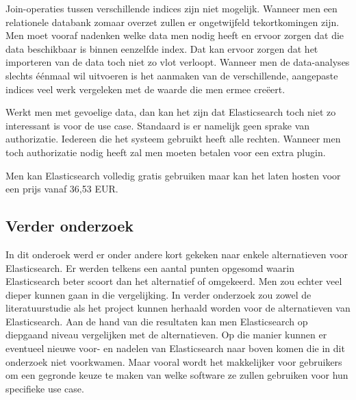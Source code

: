 Join-operaties tussen verschillende indices zijn niet mogelijk. Wanneer men een relationele databank zomaar overzet zullen er ongetwijfeld tekortkomingen zijn. Men moet vooraf nadenken welke data men nodig heeft en ervoor zorgen dat die data beschikbaar is binnen eenzelfde index. Dat kan ervoor zorgen dat het importeren van de data toch niet zo vlot verloopt. Wanneer men de data-analyses slechts éénmaal wil uitvoeren is het aanmaken van de verschillende, aangepaste indices veel werk vergeleken met de waarde die men ermee creëert.

Werkt men met gevoelige data, dan kan het zijn dat Elasticsearch toch niet zo interessant is voor de use case. Standaard is er namelijk geen sprake van authorizatie. Iedereen die het systeem gebruikt heeft alle rechten. Wanneer men toch authorizatie nodig heeft zal men moeten betalen voor een extra plugin.

Men kan Elasticsearch volledig gratis gebruiken maar kan het laten hosten voor een prijs vanaf 36,53 EUR.

\subsection{Verder onderzoek}

In dit onderoek werd er onder andere kort gekeken naar enkele alternatieven voor Elasticsearch. Er werden telkens een aantal punten opgesomd waarin Elasticsearch beter scoort dan het alternatief of omgekeerd. Men zou echter veel dieper kunnen gaan in die vergelijking. In verder onderzoek zou zowel de literatuurstudie als het project kunnen herhaald worden voor de alternatieven van Elasticsearch. Aan de hand van die resultaten kan men Elasticsearch op diepgaand niveau vergelijken met de alternatieven. Op die manier kunnen er eventueel nieuwe voor- en nadelen van Elasticsearch naar boven komen die in dit onderzoek niet voorkwamen. Maar vooral wordt het makkelijker voor gebruikers om een gegronde keuze te maken van welke software ze zullen gebruiken voor hun specifieke use case.